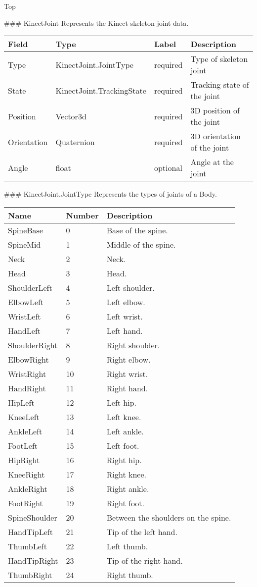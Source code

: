 Top


 \#\#\# KinectJoint Represents the Kinect skeleton joint data.

\begin{longtable}[c]{@{}llll@{}}
\toprule
Field & Type & Label & Description\tabularnewline
\midrule
\endhead
Type & KinectJoint.JointType & required & Type of skeleton
joint\tabularnewline
State & KinectJoint.TrackingState & required & Tracking state of the
joint\tabularnewline
Position & Vector3d & required & 3D position of the joint\tabularnewline
Orientation & Quaternion & required & 3D orientation of the
joint\tabularnewline
Angle & float & optional & Angle at the joint\tabularnewline
\bottomrule
\end{longtable}

 \#\#\# KinectJoint.JointType Represents the types of joints of a Body.

\begin{longtable}[c]{@{}lll@{}}
\toprule
Name & Number & Description\tabularnewline
\midrule
\endhead
SpineBase & 0 & Base of the spine.\tabularnewline
SpineMid & 1 & Middle of the spine.\tabularnewline
Neck & 2 & Neck.\tabularnewline
Head & 3 & Head.\tabularnewline
ShoulderLeft & 4 & Left shoulder.\tabularnewline
ElbowLeft & 5 & Left elbow.\tabularnewline
WristLeft & 6 & Left wrist.\tabularnewline
HandLeft & 7 & Left hand.\tabularnewline
ShoulderRight & 8 & Right shoulder.\tabularnewline
ElbowRight & 9 & Right elbow.\tabularnewline
WristRight & 10 & Right wrist.\tabularnewline
HandRight & 11 & Right hand.\tabularnewline
HipLeft & 12 & Left hip.\tabularnewline
KneeLeft & 13 & Left knee.\tabularnewline
AnkleLeft & 14 & Left ankle.\tabularnewline
FootLeft & 15 & Left foot.\tabularnewline
HipRight & 16 & Right hip.\tabularnewline
KneeRight & 17 & Right knee.\tabularnewline
AnkleRight & 18 & Right ankle.\tabularnewline
FootRight & 19 & Right foot.\tabularnewline
SpineShoulder & 20 & Between the shoulders on the spine.\tabularnewline
HandTipLeft & 21 & Tip of the left hand.\tabularnewline
ThumbLeft & 22 & Left thumb.\tabularnewline
HandTipRight & 23 & Tip of the right hand.\tabularnewline
ThumbRight & 24 & Right thumb.\tabularnewline
\bottomrule
\end{longtable}

